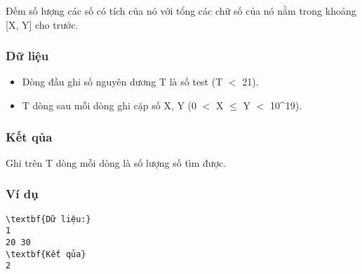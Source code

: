 



   Đếm số lượng các số có tích của nó với tổng các chữ số của nó nằm trong khoảng [X, Y] cho trước.  

\subsubsection{   Dữ liệu  }
\begin{itemize}
	\item     Dòng đầu ghi số nguyên dương T là số test (T $<$ 21).   
	\item     T dòng sau mỗi dòng ghi cặp số X, Y (0 $<$ X  $\le$  Y $<$ 10\textasciicircum19).   
\end{itemize}

\subsubsection{   Kết qủa  }

   Ghi trên T dòng mỗi dòng là số lượng số tìm được.  

\subsubsection{   Ví dụ  }
\begin{verbatim}
\textbf{Dữ liệu:} 
1
20 30
\textbf{Kết qủa} 
2
\end{verbatim}
